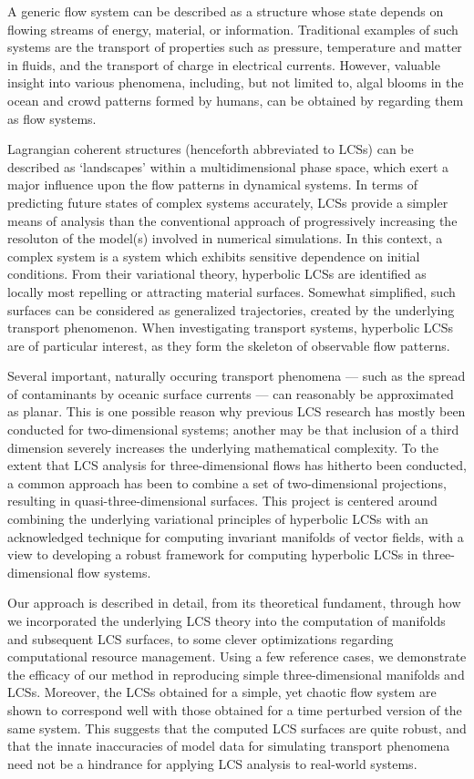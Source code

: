 \begingroup
\vspace{3mm}
A generic flow system can be described as a structure whose state depends on
flowing streams of energy, material, or information. Traditional examples of
such systems are the transport of properties such as pressure, temperature and
matter in fluids, and the transport of charge in electrical currents. However,
valuable insight into various phenomena, including, but not limited to, algal
blooms in the ocean and crowd patterns formed by humans, can be obtained by
regarding them as flow systems.

Lagrangian coherent structures (henceforth abbreviated to LCSs) can be
described as `landscapes' within a multidimensional phase space, which exert a
major influence upon the flow patterns in dynamical systems. In terms of
predicting future states of complex systems accurately, LCSs provide a simpler
means of analysis than the conventional approach of progressively increasing
the resoluton of the model(s) involved in numerical simulations. In this
context, a complex system is a system which exhibits sensitive dependence on
initial conditions. From their variational theory, hyperbolic LCSs are
identified as locally most repelling or attracting material surfaces. Somewhat
simplified, such surfaces can be considered as generalized trajectories,
created by the underlying transport phenomenon. When investigating transport
systems, hyperbolic LCSs are of particular interest, as they form the skeleton
of observable flow patterns.

Several important, naturally occuring transport phenomena --- such as the
spread of contaminants by oceanic surface currents --- can reasonably be
approximated as planar. This is one possible reason why previous
LCS research has mostly been conducted for two-dimensional systems; another may
be that inclusion of a third dimension severely increases the underlying
mathematical complexity. To the extent that LCS analysis for three-dimensional
flows has hitherto been conducted, a common approach has been to combine a set
of two-dimensional projections, resulting in quasi-three-dimensional
surfaces. This project is centered around combining the underlying variational
principles of hyperbolic LCSs with an acknowledged technique for computing
invariant manifolds of vector fields, with a view to developing a robust
framework for computing hyperbolic LCSs in three-dimensional flow systems.

Our approach is described in detail, from its theoretical fundament, through
how we incorporated the underlying LCS theory into the computation of manifolds
and subsequent LCS surfaces, to some clever optimizations regarding
computational resource management. Using a few reference cases, we demonstrate
the efficacy of our method in reproducing simple three-dimensional manifolds
and LCSs. Moreover, the LCSs obtained for a simple, yet chaotic flow
system are shown to correspond well with those obtained for a time perturbed
version of the same system. This suggests that the computed LCS surfaces are
quite robust, and that the innate inaccuracies of model data for simulating
transport phenomena need not be a hindrance for applying LCS analysis to
real-world systems.

